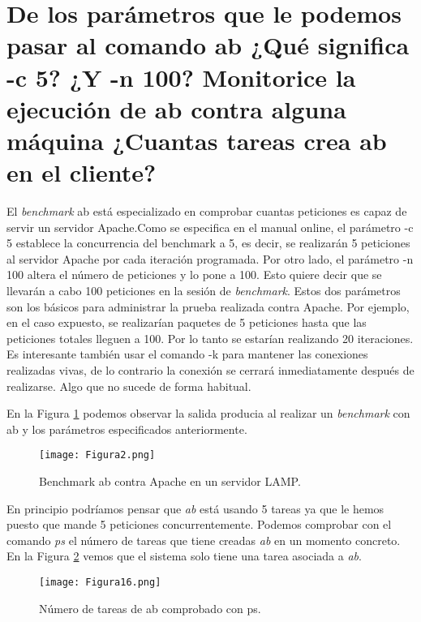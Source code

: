 
\section{De los parámetros que le podemos pasar al comando ab ¿Qué significa -c 5? ¿Y -n 100? Monitorice la ejecución de ab contra alguna máquina ¿Cuantas tareas crea ab en el cliente?}

El \textit{benchmark} ab está especializado en comprobar cuantas peticiones es capaz de servir un servidor Apache.Como se especifica en el manual 
online\cite{manab}, el parámetro -c 5 establece la concurrencia del benchmark a 5, es decir, se realizarán 5 peticiones al servidor Apache por cada iteración
programada. Por otro lado, el parámetro -n 100 altera el número de peticiones y lo pone a 100. Esto quiere decir que se llevarán a cabo 100 peticiones
en la sesión de \textit{benchmark}. Estos dos parámetros son los básicos para administrar la prueba realizada contra Apache. Por ejemplo, en el caso expuesto, se
realizarían paquetes de 5 peticiones  hasta que las peticiones totales lleguen a 100. Por lo tanto se estarían realizando 20 iteraciones. Es interesante también usar el 
comando -k para mantener las conexiones realizadas vivas, de lo contrario la conexión se cerrará inmediatamente después de realizarse. Algo que no sucede de forma
habitual.

\vspace{5mm}

En la Figura \ref{fig:figura2} podemos observar la salida producia al realizar un \textit{benchmark} con ab y los parámetros especificados anteriormente.

\begin{figure}[H] 
\centering
\texttt{[image: Figura2.png]}  
\caption{Benchmark ab contra Apache en un servidor LAMP.}\label{fig:figura2}
\end{figure}

En principio podríamos pensar que \textit{ab} está usando 5 tareas ya que le hemos puesto que mande 5 peticiones concurrentemente. Podemos comprobar con el 
comando \textit{ps} \cite{manps} el número de tareas que tiene creadas \textit{ab} en un momento concreto. En la Figura \ref{fig:figura16} vemos que el sistema solo tiene una tarea asociada a \textit{ab}.

\begin{figure}[H] 
\centering
\texttt{[image: Figura16.png]}  
\caption{Número de tareas de ab comprobado con ps.}\label{fig:figura16}
\end{figure}

